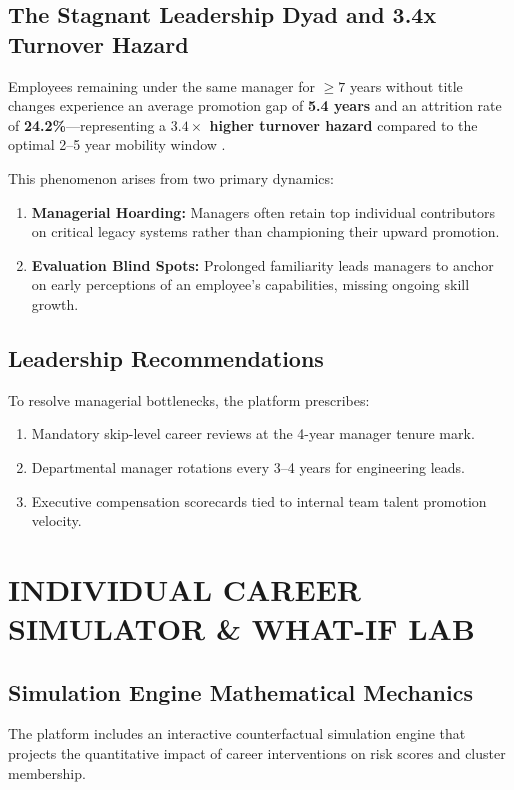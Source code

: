\documentclass[12pt,a4paper,oneside]{report}
\begin{document}
\section{The Stagnant Leadership Dyad and 3.4x Turnover Hazard}
Employees remaining under the same manager for $\ge 7$ years without title changes experience an average promotion gap of \textbf{5.4 years} and an attrition rate of \textbf{24.2\%}---representing a \textbf{$3.4\times$ higher turnover hazard} compared to the optimal 2--5 year mobility window \cite{ref_campion_rotation}.

This phenomenon arises from two primary dynamics:
\begin{enumerate}
  \item \textbf{Managerial Hoarding:} Managers often retain top individual contributors on critical legacy systems rather than championing their upward promotion.
  \item \textbf{Evaluation Blind Spots:} Prolonged familiarity leads managers to anchor on early perceptions of an employee's capabilities, missing ongoing skill growth.
\end{enumerate}

\section{Leadership Recommendations}
To resolve managerial bottlenecks, the platform prescribes:
\begin{enumerate}
  \item Mandatory skip-level career reviews at the 4-year manager tenure mark.
  \item Departmental manager rotations every 3--4 years for engineering leads.
  \item Executive compensation scorecards tied to internal team talent promotion velocity.
\end{enumerate}

\clearpage
\chapter{INDIVIDUAL CAREER SIMULATOR \& WHAT-IF LAB}

\section{Simulation Engine Mathematical Mechanics}
The platform includes an interactive counterfactual simulation engine that projects the quantitative impact of career interventions on risk scores and cluster membership.
\end{document}
